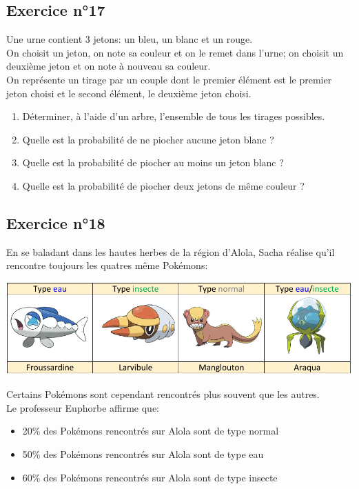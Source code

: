 \documentclass[12pt,a4paper]{article}
\begin{document}
\subsection*{Exercice n°17}

Une urne contient 3 jetons: un bleu, un blanc et un rouge.\\
On choisit un jeton, on note sa couleur et on le remet dans l'urne; on choisit un deuxième jeton et on note à nouveau sa couleur.\\
On représente un tirage par un couple dont le premier élément est le premier jeton choisi et le second élément, le deuxième jeton choisi.\\

\begin{enumerate}
    \item Déterminer, à l'aide d'un arbre, l'ensemble de tous les tirages possibles.
    \item Quelle est la probabilité de ne piocher aucune jeton blanc ?
    \item Quelle est la probabilité de piocher au moins un jeton blanc ?
    \item Quelle est la probabilité de piocher deux jetons de même couleur ?
\end{enumerate}

\newpage
\subsection*{Exercice n°18}
En se baladant dans les hautes herbes de la région d'Alola, Sacha réalise qu'il rencontre toujours les quatres même Pokémons:

\begin{center}
    \includegraphics[scale=0.5]{pokemon.png}
\end{center}

Certains Pokémons sont cependant rencontrés plus souvent que les autres.\\
Le professeur Euphorbe affirme que:
\begin{itemize}
    \item 20\% des Pokémons rencontrés sur Alola sont de type normal
    \item 50\% des  Pokémons rencontrés sur Alola sont de type eau
    \item 60\% des Pokémons rencontrés sur Alola sont de type insecte
\end{itemize}
\end{document}
